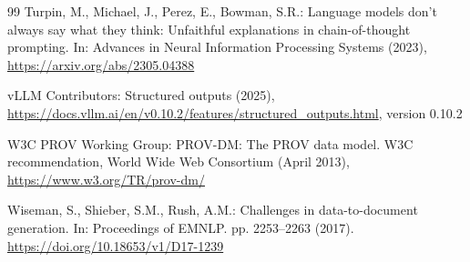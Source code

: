 \documentclass[runningheads]{llncs}
\begin{document}
\begin{thebibliography}{99}
Turpin, M., Michael, J., Perez, E., Bowman, S.R.: Language models don't always
  say what they think: Unfaithful explanations in chain-of-thought prompting.
  In: Advances in Neural Information Processing Systems (2023),
  \url{https://arxiv.org/abs/2305.04388}

{vLLM Contributors}: Structured outputs (2025),
  \url{https://docs.vllm.ai/en/v0.10.2/features/structured_outputs.html},
  version 0.10.2

{W3C PROV Working Group}: {PROV-DM}: The {PROV} data model. {W3C}
  recommendation, World Wide Web Consortium (April 2013),
  \url{https://www.w3.org/TR/prov-dm/}

Wiseman, S., Shieber, S.M., Rush, A.M.: Challenges in data-to-document
generation. In: Proceedings of EMNLP. pp. 2253--2263 (2017).
\url{https://doi.org/10.18653/v1/D17-1239}

\end{thebibliography}
\end{document}
